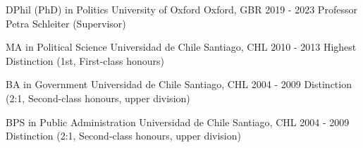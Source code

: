 





\begin{cventries}

\vspace{0.5mm}
\cventry
{DPhil (PhD) in Politics} 
{University of Oxford} 
{Oxford, GBR} 
{2019 - 2023} 
{Professor Petra Schleiter (Supervisor)} \vspace{1.5mm}

\cventry
{MA in Political Science} 
{Universidad de Chile} 
{Santiago, CHL} 
{2010 - 2013} 
{Highest Distinction (1st, First-class honours)} \vspace{1.5mm}

\cventry
{BA in Government} 
{Universidad de Chile} 
{Santiago, CHL} 
{2004 - 2009} 
{Distinction (2:1, Second-class honours, upper division)} \vspace{1.5mm}

\cventry
{BPS in Public Administration} 
{Universidad de Chile} 
{Santiago, CHL} 
{2004 - 2009} 
{Distinction (2:1, Second-class honours, upper division)}\vspace{1.5mm}

\end{cventries}
